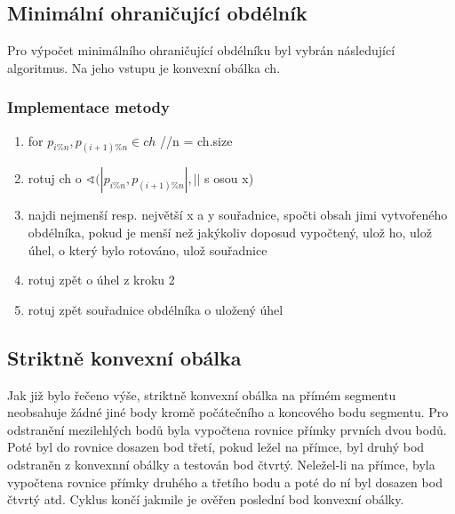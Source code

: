 \documentclass[a4paper, 12pt]{article}
\begin{document}
\subsection{Minimální ohraničující obdélník}
Pro výpočet minimálního ohraničující obdélníku byl vybrán následující algoritmus. Na jeho vstupu je konvexní obálka ch.

\subsubsection{Implementace metody}
\begin{enumerate}

	\item for $p_{i\%n}, p_{(i+1)\%n} \in ch$ //n = ch.size
	\item \hspace{1cm} rotuj ch o $\sphericalangle (|p_{i\%n}, p_{(i+1)\%n}| , ||$ s osou x)
	\item \hspace{1cm} najdi nejmenší resp. největší x a y souřadnice, spočti obsah jimi vytvořeného obdélníka, pokud je menší než jakýkoliv doposud vypočtený, ulož ho, ulož úhel, o který bylo rotováno, ulož souřadnice 
	\item \hspace{1cm} rotuj zpět o úhel z kroku 2
	\item rotuj zpět souřadnice obdélníka o uložený úhel	
	
\end{enumerate}

\vspace{1,5cm}


\subsection{Striktně konvexní obálka}
Jak již bylo řečeno výše, striktně konvexní obálka na přímém segmentu neobsahuje žádné jiné body kromě počátečního a koncového bodu segmentu. Pro odstranění mezilehlých bodů byla vypočtena rovnice přímky prvních dvou bodů. Poté byl do rovnice dosazen bod třetí, pokud ležel na přímce, byl druhý bod odstraněn z konvexnní obálky a testován bod čtvrtý. Neležel-li na přímce, byla vypočtena rovnice přímky druhého a třetího bodu a poté do ní byl dosazen bod čtvrtý atd. Cyklus končí jakmile je ověřen poslední bod konvexní obálky.
\end{document}
